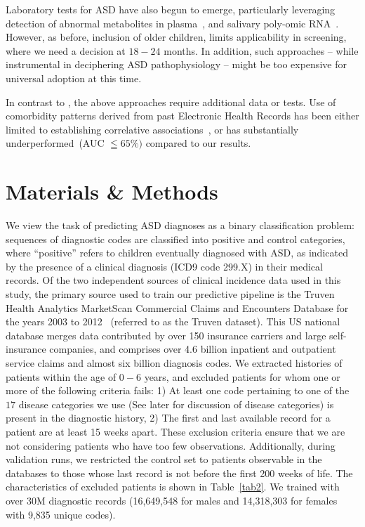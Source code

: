 \documentclass[onecolumn,10pt]{IEEEtran}
\begin{document}
Laboratory tests for ASD have also begun to emerge, particularly leveraging detection of abnormal metabolites in plasma~\cite{smith2020metabolomics,howsmon2017classification}, and  salivary poly-omic RNA~\cite{hicks2018validation}. However, as before, inclusion  of older children, limits  applicability in  screening, where we need a decision at $18-24$ months. In addition, such approaches -- while  instrumental in deciphering ASD pathophysiology -- might be too expensive for universal adoption at this time.

In contrast to \acor, the above approaches require additional data or tests. Use of comorbidity patterns derived from past  Electronic Health Records  has been either limited to establishing correlative associations~\cite{doshi2014comorbidity,bishop2018using}, or has substantially underperformed~\cite{lingren2016electronic}(AUC $\leqq 65\%)$ compared to our results.

\section*{Materials \& Methods}
We view the task of predicting  ASD diagnoses   as a binary classification problem: sequences of diagnostic codes are classified into positive and control categories, where ``positive'' refers to children eventually diagnosed with ASD, as indicated by the presence of a clinical diagnosis (ICD9 code 299.X) in their medical records. Of the two independent sources of clinical incidence data used in this study,  the primary source used to train our predictive pipeline  is the Truven Health Analytics MarketScan\textsuperscript{\textregistered} Commercial Claims and Encounters Database for the years 2003 to 2012~\cite{hansen2017truven} (referred to  as the Truven dataset). This US national database merges  data contributed by over 150 insurance carriers and large self-insurance companies,  and comprises over  4.6 billion inpatient and outpatient service claims and  almost six billion diagnosis codes. We extracted histories of patients within the age of $0-6$ years, and excluded  patients for whom one or more of the following criteria fails:  1) At least one code pertaining to one of the $17$ disease categories we use (See later for discussion of disease categories) is present in the diagnostic history, 2) The first and last available record for a patient are  at least 15 weeks apart. These exclusion criteria ensure that we are not considering patients who have too few observations. Additionally, during validation runs,  we restricted the control set to patients observable in the databases to those whose last record is not before the first 200 weeks of life. The characteristics of excluded patients is shown in Table~\ref{tab2}. We trained with over  30M diagnostic records (16,649,548 for males and  14,318,303  for females with 9,835 unique  codes).
\end{document}
